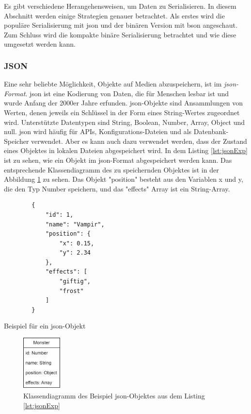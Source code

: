 Es gibt verschiedene Herangehensweisen, um Daten zu Serialisieren. In diesem Abschnitt werden einige Strategien genauer betrachtet. Als erstes wird die populäre Serialisierung mit \ac{json} und der binären Version mit \ac{bson} angeschaut. Zum Schluss wird die kompakte binäre Serialisierung betrachtet und wie diese umgesetzt werden kann.

\subsubsection{JSON}
Eine sehr beliebte Möglichkeit, Objekte auf Medien abzuspeichern, ist im \textit{\ac{json}-Format}. \ac{json} ist eine Kodierung von Daten, die für Menschen lesbar ist und wurde Anfang der 2000er Jahre erfunden. \ac{json}-Objekte sind Ansammlungen von Werten, denen jeweils ein Schlüssel in der Form eines String-Wertes zugeordnet wird. Unterstützte Datentypen sind String, Boolean, Number, Array, Object und null. \ac{json} wird häufig für APIs, Konfigurations-Dateien und als Datenbank-Speicher verwendet. Aber es kann auch dazu verwendet werden, dass der Zustand eines Objektes in lokalen Dateien abgespeichert wird.\cite{mongodbJSONBSON} In dem Listing \ref{lst:jsonExp} ist zu sehen, wie ein Objekt im \ac{json}-Format abgespeichert werden kann. Das entsprechende Klassendiagramm des zu speichernden Objektes ist in der Abbildung \ref{fig:monsterBspKlasse} zu sehen. Das Objekt "position" besteht aus den Variablen x und y, die den Typ Number speichern, und das "effects" Array ist ein String-Array. 

\begin{listing}[htp]
    \begin{verbatim}
        {
            "id": 1,
            "name": "Vampir",
            "position": {
                "x": 0.15,
                "y": 2.34
            },
            "effects": [
                "giftig", 
                "frost"
            ]
        }
    \end{verbatim}
    \caption{Beispiel für ein \ac{json}-Objekt}
    \label{lst:jsonExp}
\end{listing}

\begin{figure}[htp]
    \centering
    \includegraphics[width=0.18\textwidth]{images/MonsterBspKlasse.png}
    \caption{Klassendiagramm des Beispiel \ac{json}-Objektes aus dem Listing \ref{lst:jsonExp}}
    \label{fig:monsterBspKlasse}
\end{figure}


